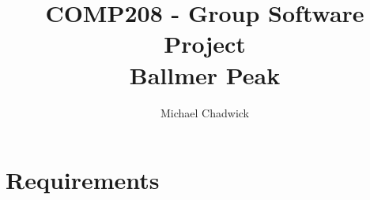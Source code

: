 \documentclass[openany]{book}
\title{COMP208 - Group Software Project\\Ballmer Peak}
\author{Michael Chadwick}
\begin{document}
\maketitle
\tableofcontents

\part{Requirements}


%


%


%
%
%
%
%
%
%
%

\printbibliography
\end{document}
